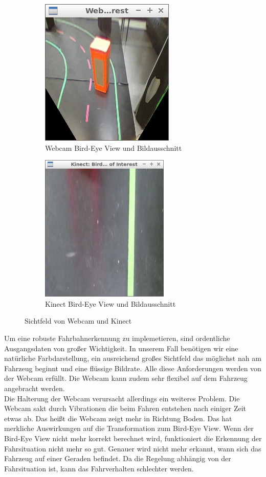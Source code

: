 \begin{figure}[ht]
	\centering
	\begin{subfigure}{250px}
		\centering
		\includegraphics[width=242px, height=267px]{images/Webcam_BirdEye_ROI.png}
		\caption{Webcam Bird-Eye View und Bildausschnitt}
	\end{subfigure}
	\begin{subfigure}{240px}
		\centering
		\includegraphics[width=232px, height=267px]{images/Kinect_BirdEye_ROI.png}
		\caption{Kinect Bird-Eye View und Bildausschnitt}
	\end{subfigure}
	\caption{Sichtfeld von Webcam und Kinect}
\end{figure}

Um eine robuste Fahrbahnerkennung zu implemetieren, sind ordentliche Ausgangsdaten von großer Wichtigkeit.
In unserem Fall benötigen wir eine natürliche Farbdarstellung, ein ausreichend großes Sichtfeld das möglichst nah am Fahrzeug beginnt und eine flüssige Bildrate. 
Alle diese Anforderungen werden von der Webcam erfüllt.
Die Webcam kann zudem sehr flexibel auf dem Fahrzeug angebracht werden.
\\
Die Halterung der Webcam verursacht allerdings ein weiteres Problem.
Die Webcam sakt durch Vibrationen die beim Fahren entstehen nach einiger Zeit etwas ab.
Das heißt die Webcam zeigt mehr in Richtung Boden.
Das hat merkliche Auswirkungen auf die Transformation zum Bird-Eye View.
Wenn der Bird-Eye View nicht mehr korrekt berechnet wird, funktioniert die Erkennung der Fahrsituation nicht mehr so gut.
Genauer wird nicht mehr erkannt, wann sich das Fahrzeug auf einer Geraden befindet.
Da die Regelung abhängig von der Fahrsituation ist, kann das Fahrverhalten schlechter werden.

